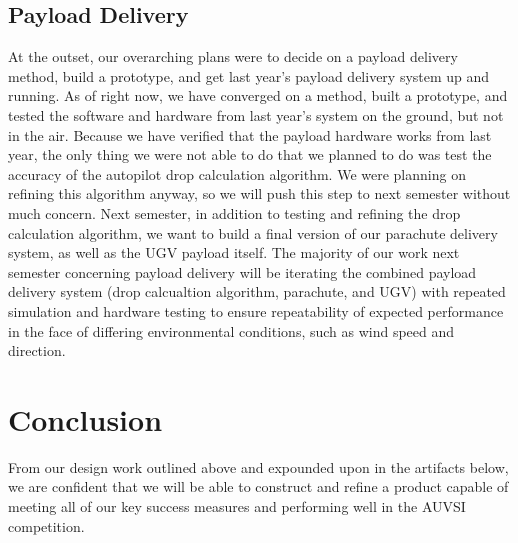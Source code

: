 \documentclass[]{auvsi_doc}
\begin{document}
\subsection{Payload Delivery}
At the outset, our overarching plans were to decide on a payload delivery method, build a prototype, and get last year's payload delivery system up and running. As of right now, we have converged on a method, built a prototype, and tested the software and hardware from last year's system on the ground, but not in the air. Because we have verified that the payload hardware works from last year, the only thing we were not able to do that we planned to do was test the accuracy of the autopilot drop calculation algorithm. We were planning on refining this algorithm anyway, so we will push this step to next semester without much concern.
Next semester, in addition to testing and refining the drop calculation algorithm, we want to build a final version of our parachute delivery system, as well as the UGV payload itself. The majority of our work next semester concerning payload delivery will be iterating the combined payload delivery system (drop calcualtion algorithm, parachute, and UGV) with repeated simulation and hardware testing to ensure repeatability of expected performance in the face of differing environmental conditions, such as wind speed and direction.
\section{Conclusion}
From our design work outlined above and expounded upon in the artifacts below, we are confident that we will be able to construct and refine a product capable of meeting all of our key success measures and performing well in the AUVSI competition.
\end{document}
